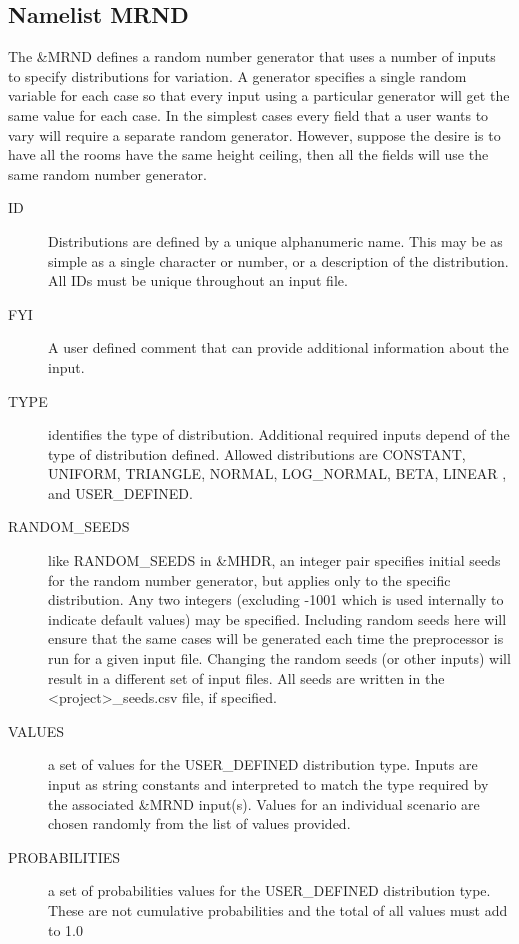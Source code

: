 \documentclass[12pt,twoside]{book}
\begin{document}
\subsection{Namelist MRND}

The {\ct \&MRND} defines a random number generator that uses a number of inputs to specify distributions for variation. A generator specifies a single random variable for each case so that every input using a particular generator will get the same value for each case. In the simplest cases every field that a user wants to vary will require a separate random generator. However, suppose the desire is to have all the rooms have the same height ceiling, then all the fields will use the same random number generator. %

\begin{description}
  \item[ID] Distributions are defined by a unique alphanumeric name. This may be as simple as a single character or number, or a description of the distribution. All IDs must be unique throughout an input file.
  \item[FYI] A user defined comment that can provide additional information about the input.
  \item[TYPE] identifies the type of distribution. Additional required inputs depend of the type of distribution defined. Allowed distributions are {\ct CONSTANT},  {\ct UNIFORM}, {\ct TRIANGLE}, {\ct NORMAL}, {\ct LOG\_NORMAL}, {\ct BETA}, {\ct LINEAR }, and {\ct USER\_DEFINED}.
  \item[RANDOM\_SEEDS] like {\ct RANDOM\_SEEDS} in {\ct \&MHDR}, an integer pair specifies initial seeds for the random number generator, but applies only to the specific distribution. Any two integers (excluding -1001 which is used internally to indicate default values) may be specified. Including random seeds here will ensure that the same cases will be generated each time the preprocessor is run for a given input file. Changing the random seeds (or other inputs) will result in a different set of input files. All seeds are written in the {\ct <project>\_seeds.csv} file, if specified.
  \item[VALUES] a set of values for the {\ct USER\_DEFINED} distribution type. Inputs are input as string constants and interpreted to match the type required by the associated {\ct \&MRND} input(s). Values for an individual scenario are chosen randomly from the list of values provided.
  \item[PROBABILITIES] a set of probabilities values for the {\ct USER\_DEFINED} distribution type. These are not cumulative probabilities and the total of all values must add to 1.0

\end{description}
\end{document}
